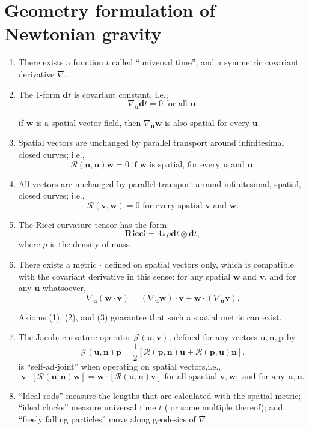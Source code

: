 \section{Geometry formulation of Newtonian gravity}
\begin{enumerate}
\item There exists a function $t$ called ``universal time'', and a symmetric covariant derivative $\nabla$.
\item The 1-form $\bm{d}t$ is covariant constant, i.e.,
\[\nabla_{\bm{u}} \bm{d}t = 0  \mbox{ for all } \bm{u}.\]
\begin{note}
if $\bm{w}$ is a spatial vector field, then $\nabla_{\bm{u}}\bm{w}$ is also spatial for every $\bm{u}$.
\end{note}
\item Spatial vectors are unchanged by parallel transport around infinitesimal closed curves; i.e.,
\[\mathcal{R}(\bm{n},\bm{u}) \bm{w}=0 \mbox{ if }\bm{w}\mbox{ is spatial, for every } \bm{u} \mbox{ and } \bm{n}.\]
\item All vectors are unchanged by parallel transport around infinitesimal, spatial, closed curves; i.e.,
\[\mathcal{R}(\bm{v},\bm{w}) =0 \mbox{ for every spatial }\bm{v} \mbox{ and } \bm{w}.\]
\item The Ricci curvature tensor has the form
\[\bm{Ricci} = 4 \pi \rho \bm{d}t \otimes \bm{d}t,\]
where $\rho$ is the density of mass.
\item There exists a metric $\bm{\cdot}$ defined on spatial vectors only, which is compatible with the covariant derivative in this sense: for any spatial $\bm{w}$ and $\bm{v}$, and for any $\bm{u}$ whatsoever,
\[\nabla_{\bm{u}}(\bm{w} \cdot \bm{v}) = (\nabla_{\bm{u}} \bm{w}) \cdot \bm{v} + \bm{w} \cdot (\nabla_{\bm{u}} \bm{v}).\]
\begin{note}
Axioms (1), (2), and (3) guarantee that such a spatial metric can exist.
\end{note}
\item The Jacobi curvature operator $\mathcal{J}(\bm{u},\bm{v})$, defined for any vectors $\bm{u},\bm{n},\bm{p}$ by
\[\mathcal{J}(\bm{u},\bm{n})\bm{p} = \frac{1}{2}[\mathcal{R}(\bm{p},\bm{n})\bm{u} + \mathcal{R}(\bm{p},\bm{u})\bm{n}].\]
is ``self-ad-joint'' when operating on spatial vectors,i.e.,
\[\bm{v} \cdot [\mathcal{R}(\bm{u},\bm{n})\bm{w}] = 
\bm{w} \cdot [\mathcal{R}(\bm{u},\bm{n})\bm{v}] \mbox{ for all spactial }\bm{v},\bm{w};\mbox{ and for any }\bm{u},\bm{n}.\]
\item ``Ideal rods'' measure the lengths that are calculated with the spatial metric; ``ideal clocks'' measure universal time $t$ ( or some multiple thereof); and ``freely falling particles'' move along geodesics of $\nabla$.
\end{enumerate}


